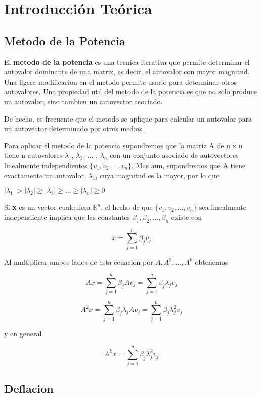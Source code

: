 \section{Introducci\'on Te\'orica}
\subsection{Metodo de la Potencia}
El \textbf{metodo de la potencia} es una tecnica iterativa que permite determinar el autovalor dominante de una matriz, es decir, el autovalor con mayor magnitud. Una ligera modificacion en el metodo permite usarlo para determinar otros autovalores. Una propiedad util del metodo de la potencia es que no solo produce un autovalor, sino tambien un autovector asociado. 

De hecho, es frecuente que el metodo se aplique para calcular un autovalor para un autovector determinado por otros medios.

Para aplicar el metodo de la potencia supondremos que la matriz A de n x n tiene n autovalores $\lambda_1$, $\lambda_2$, ... , $\lambda_n$ con un conjunto asociado de autovectores linealmente independientes $\{v_1,v_2, ..., v_n\}$. Mas aun, supondremos que A tiene exactamente un autovalor, $\lambda_1$, cuya magnitud es la mayor, por lo que 
\begin{center}
$|\lambda_1| > |\lambda_2| \geq |\lambda_3| \geq ... \geq |\lambda_n| \geq 0$
\end{center}

Si \textbf{x} es un vector cualquiera $\mathbb{R}^n$, el hecho de que $\{v_1,v_2, ..., v_n\}$ sea linealmente independiente implica que las constantes $\beta_1,\beta_2, ..., \beta_n$ existe con 

\[ x = \sum_{j = 1}^n \beta_j v_j \]

Al multiplicar ambos lados de esta ecuacion por $A, A^2, ..., A^k$ obtenemos

\[ Ax = \sum_{j = 1}^n \beta_jAv_j =  \sum_{j = 1}^n \beta_j \lambda_j v_j\]

\[ A^2x = \sum_{j = 1}^n \beta_j \lambda_j Av_j =  \sum_{j = 1}^n \beta_j \lambda_j^2 v_j\]

y en general

\[ A^k x =  \sum_{j = 1}^n \beta_j \lambda_j^k v_j\]

\subsection{Deflacion}

